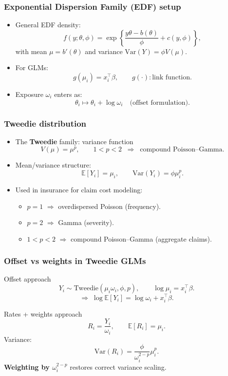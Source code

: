 \documentclass[10pt,aspectratio=169,xcolor={dvipsnames},usepdftitle=false]{beamer}
\begin{document}
\begin{frame}
\frametitle{Exponential Dispersion Family (EDF) setup}
\small
\begin{itemize}
\item General EDF density:
\[
f(y;\theta,\phi) = \exp\left\{\frac{y\theta - b(\theta)}{\phi} + c(y,\phi)\right\},
\]
with mean $\mu = b'(\theta)$ and variance $\mathrm{Var}(Y)=\phi V(\mu)$.
\item For GLMs:
\[
g(\mu_i) = x_i^\top \beta, \qquad g(\cdot): \text{link function}.
\]
\item Exposure $\omega_i$ enters as:
\[
\theta_i \mapsto \theta_i + \log \omega_i \quad \text{(offset formulation)}.
\]
\end{itemize}
\end{frame}


\begin{frame}
\frametitle{Tweedie distribution}
\small
\begin{itemize}
\item The \textbf{Tweedie} family: variance function
\[
V(\mu) = \mu^p, \qquad 1 < p < 2 \;\; \Rightarrow \;\; \text{compound Poisson--Gamma}.
\]
\item Mean/variance structure:
\[
\mathbb{E}[Y_i] = \mu_i, \qquad \mathrm{Var}(Y_i) = \phi \mu_i^p.
\]
\item Used in insurance for claim cost modeling:
  \begin{itemize}
    \item $p=1$ $\Rightarrow$ overdispersed Poisson (frequency).
    \item $p=2$ $\Rightarrow$ Gamma (severity).
    \item $1<p<2$ $\Rightarrow$ compound Poisson–Gamma (aggregate claims).
  \end{itemize}
\end{itemize}
\end{frame}


\begin{frame}
\frametitle{Offset vs weights in Tweedie GLMs}
\small
\begin{block}{Offset approach}
\[
Y_i \sim \text{Tweedie}(\mu_i \omega_i, \phi, p), \qquad \log \mu_i = x_i^\top \beta.
\]
\[
\Rightarrow \; \log \mathbb{E}[Y_i] = \log \omega_i + x_i^\top \beta.
\]
\end{block}

\begin{block}{Rates + weights approach}
\[
R_i = \frac{Y_i}{\omega_i}, \qquad \mathbb{E}[R_i]=\mu_i.
\]
Variance:
\[
\mathrm{Var}(R_i) = \frac{\phi}{\omega_i^{2-p}} \mu_i^p.
\]
\textbf{Weighting by $\omega_i^{2-p}$} restores correct variance scaling.
\end{block}
\end{frame}
\end{document}
